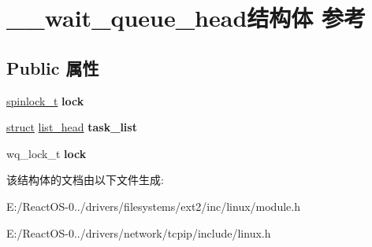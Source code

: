 \hypertarget{struct____wait__queue__head}{}\section{\+\_\+\+\_\+wait\+\_\+queue\+\_\+head结构体 参考}
\label{struct____wait__queue__head}
\subsection*{Public 属性}
\begin{DoxyCompactItemize}
\item 
\mbox{\label{struct____wait__queue__head_adf42be939d08269f467f1501a060f6fd}} 
\hyperlink{structspinlock__t}{spinlock\+\_\+t} {\bfseries lock}
\item 
\mbox{\label{struct____wait__queue__head_a37e23fce7f99bb98e21809d9f9ebf9f0}} 
\hyperlink{interfacestruct}{struct} \hyperlink{structlist__head}{list\+\_\+head} {\bfseries task\+\_\+list}
\item 
\mbox{\label{struct____wait__queue__head_a167bef1bb44538c7a75ba5e5d60ccd3b}} 
wq\+\_\+lock\+\_\+t {\bfseries lock}
\end{DoxyCompactItemize}


该结构体的文档由以下文件生成\+:\begin{DoxyCompactItemize}
\item 
E\+:/\+React\+O\+S-\/0../drivers/filesystems/ext2/inc/linux/module.\+h\item 
E\+:/\+React\+O\+S-\/0../drivers/network/tcpip/include/linux.\+h\end{DoxyCompactItemize}
